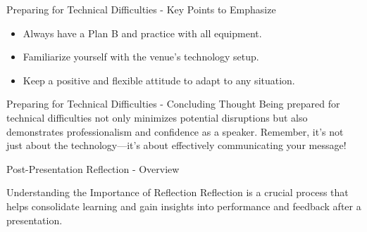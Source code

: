 \documentclass[aspectratio=169]{beamer}
\begin{document}
\begin{frame}[fragile]{Preparing for Technical Difficulties - Key Points to Emphasize}
    \begin{itemize}
        \item Always have a Plan B and practice with all equipment.
        \item Familiarize yourself with the venue's technology setup.
        \item Keep a positive and flexible attitude to adapt to any situation.
    \end{itemize}
\end{frame}

\begin{frame}[fragile]{Preparing for Technical Difficulties - Concluding Thought}
    Being prepared for technical difficulties not only minimizes potential disruptions but also demonstrates professionalism and confidence as a speaker. Remember, it's not just about the technology—it's about effectively communicating your message!
\end{frame}

\begin{frame}[fragile]{Post-Presentation Reflection - Overview}
    \begin{block}{Understanding the Importance of Reflection}
        Reflection is a crucial process that helps consolidate learning and gain insights into performance and feedback after a presentation.
    \end{block}
\end{frame}
\end{document}
